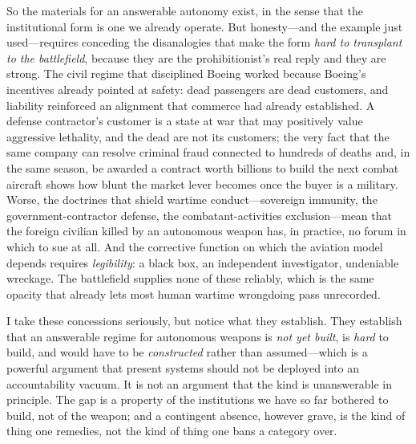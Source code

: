 \documentclass[11pt]{article}
\begin{document}
So the materials for an answerable autonomy exist, in the sense that the institutional form is one we already operate. But honesty---and the example just used---requires conceding the disanalogies that make the form \emph{hard to transplant to the battlefield}, because they are the prohibitionist's real reply and they are strong. The civil regime that disciplined Boeing worked because Boeing's incentives already pointed at safety: dead passengers are dead customers, and liability reinforced an alignment that commerce had already established. A defense contractor's customer is a state at war that may positively value aggressive lethality, and the dead are not its customers; the very fact that the same company can resolve criminal fraud connected to hundreds of deaths and, in the same season, be awarded a contract worth billions to build the next combat aircraft shows how blunt the market lever becomes once the buyer is a military. Worse, the doctrines that shield wartime conduct---sovereign immunity, the government-contractor defense, the combatant-activities exclusion---mean that the foreign civilian killed by an autonomous weapon has, in practice, no forum in which to sue at all. And the corrective function on which the aviation model depends requires \emph{legibility}: a black box, an independent investigator, undeniable wreckage. The battlefield supplies none of these reliably, which is the same opacity that already lets most human wartime wrongdoing pass unrecorded.

I take these concessions seriously, but notice what they establish. They establish that an answerable regime for autonomous weapons is \emph{not yet built}, is \emph{hard} to build, and would have to be \emph{constructed} rather than assumed---which is a powerful argument that present systems should not be deployed into an accountability vacuum. It is not an argument that the kind is unanswerable in principle. The gap is a property of the institutions we have so far bothered to build, not of the weapon; and a contingent absence, however grave, is the kind of thing one remedies, not the kind of thing one bans a category over.
\end{document}
